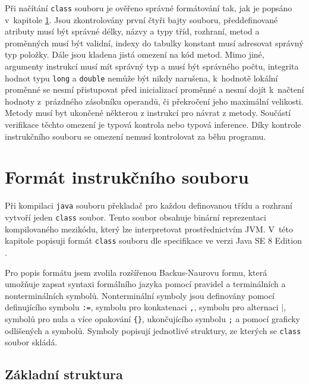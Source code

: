 Při načítání \texttt{class} souboru je ověřeno správné formátování tak, jak je popsáno v~kapitole \ref{Format}. Jsou zkontrolovány první čtyři bajty souboru, předdefinované atributy musí být správné délky, názvy a typy tříd, rozhraní, metod a proměnných musí být validní, indexy do tabulky konstant musí adresovat správný typ položky. Dále jsou kladena jistá omezení na kód metod. Mimo jiné, argumenty instrukcí musí mít správný typ a musí být správného počtu, integrita hodnot typu \texttt{long} a \texttt{double} nemůže být nikdy narušena, k~hodnotě lokální proměnné se nesmí přistupovat před inicializací proměnné a nesmí dojít k~načtení hodnoty z~prázdného zásobníku operandů, či překročení jeho maximální velikosti. Metody musí byt ukončené některou z instrukcí pro návrat z metody. Součástí verifikace těchto omezení je typová kontrola nebo typová inference. Díky kontrole instrukčního souboru se omezení nemusí kontrolovat za běhu programu.


\section{Formát instrukčního souboru}\label{Format}


Při kompilaci \texttt{java} souboru překladač pro každou definovanou třídu a rozhraní vytvoří jeden \texttt{class} soubor. Tento soubor obsahuje binární reprezentaci kompilovaného mezikódu, který lze interpretovat prostřednictvím JVM.  V~této kapitole popisuji formát \texttt{class} souboru dle specifikace ve verzi Java SE 8 Edition \cite{Lindholm:JVM}.

Pro popis formátu jsem zvolila rozšířenou Backus-Naurovu formu, která umožňuje zapsat syntaxi formálního jazyka pomocí pravidel a terminálních a nonterminálních symbolů. Nonterminální symboly jsou definovány pomocí definujícího symbolu \texttt{:=}, symbolu pro konkatenaci \texttt{,}, symbolu pro alternaci \texttt{$\mathtt{|}$}, symbolů pro nula a více opakování \texttt{\{\}}, ukončujícího symbolu \texttt{;} a pomocí graficky odlišených  a  symbolů. Symboly popisují jednotlivé struktury, ze kterých se \texttt{class} soubor skládá.

\subsection{Základní struktura}\label{FormatBasic}

